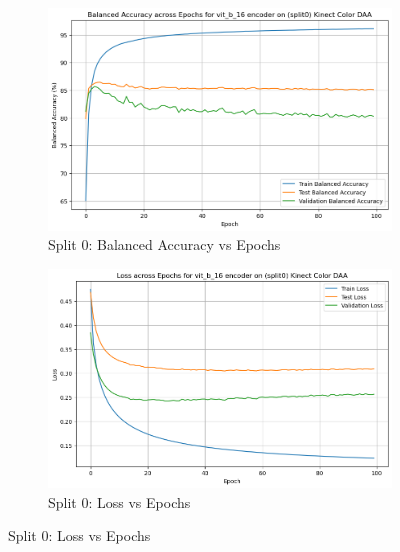 \begin{figure}[htbp]
    \centering
    \begin{subfigure}[b]{0.45\textwidth}
        \includegraphics[width=\textwidth]{Images_Thesis/Tensboard_runs_images_all/Experiment_00_Sup_D_A_no_Aug/Split_0/output_bal_acc_no_aug.png}
        \caption{Split 0: Balanced Accuracy vs Epochs}
        \label{fig:Exp_1_01}
    \end{subfigure}
    \hfill %
    \begin{subfigure}[b]{0.45\textwidth}
        \includegraphics[width=\textwidth]{Images_Thesis/Tensboard_runs_images_all/Experiment_00_Sup_D_A_no_Aug/Split_0/output_loss_splt_0_no_aug_d_a.png}
        \caption{Split 0: Loss vs Epochs}
        \label{fig:Exp_1_02}
    \end{subfigure}


\end{figure}
